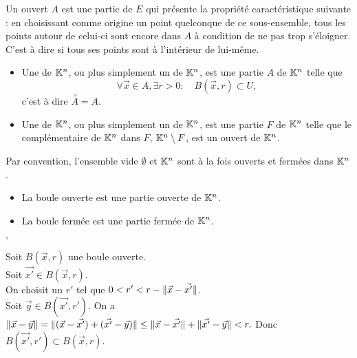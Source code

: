 \documentclass{book}
\begin{document}
Un ouvert $A$ est une partie de $E$ qui présente la propriété caractéristique suivante : en choisissant comme origine un point quelconque de ce sous-ensemble, tous les points autour de celui-ci sont encore dans $A$ à condition de ne pas trop s'éloigner. C'est à dire si tous ses points sont à l'intérieur de lui-même. 
\begin{Definition}
\begin{itemize}
\item Une  de $\mathbb{K}^n$, ou plus simplement un  de $\mathbb{K}^n$, est une partie $A$ de $\mathbb{K}^n$ telle que $$\forall \vec{x}\in A, \exists r>0:\quad B(\vec{x},r)\subset U,$$
c'est à dire  $\stackrel {\ \circ }{A}=A.$
\item Une  de $\mathbb{K}^n$, ou plus simplement un  de $\mathbb{K}^n$, est une partie $F$ de $\mathbb{K}^n$ telle que le complémentaire de $\mathbb{K}^n$ dans $F$, $\mathbb{K}^n\setminus F$, est un ouvert de $\mathbb{K}^n$.
\end{itemize}
Par convention, l'ensemble vide $\emptyset$ et $\mathbb{K}^n$ sont à la fois ouverts et fermées dans $\mathbb{K}^n$.
\end{Definition}
\begin{Proposition}
\begin{itemize}
\item La boule ouverte est une partie ouverte de $\mathbb{K}^n$.
\item La boule fermée  est une partie fermée de $\mathbb{K}^n$.
\end{itemize}
\end{Proposition}
\begin{Demonstration}$,$\\
\begin{minipage}[c]{0.6\linewidth}{
Soit $B(\vec{x},r)$ une boule ouverte.\\
Soit $\vec{x'}\in B(\vec{x},r)$. \\
On choisit un $r'$ tel que $0< r' < r -\mathopen\lVert \vec{x}-\vec{x'} \mathclose\rVert$.\\
Soit $\vec{y}\in B(\vec{x'},r')$. On a $\mathopen\lVert \vec{x}-\vec{y} \mathclose\rVert=\mathopen\lVert (\vec{x}-\vec{x'})+(\vec{x'}-\vec{y}) \mathclose\rVert\leq \mathopen\lVert \vec{x}-\vec{x'} \mathclose\rVert + \mathopen\lVert \vec{x'}-\vec{y} \mathclose\rVert<r.$ Donc $B(\vec{x'},r')\subset B(\vec{x},r).$
}
\end{minipage} 
    \begin{minipage}[c]{0.4\linewidth}{\hspace*{0.2\linewidth}
    \begin{tiny}
\end{tiny}
}
\end{minipage} 
\end{Demonstration}
\end{document}
